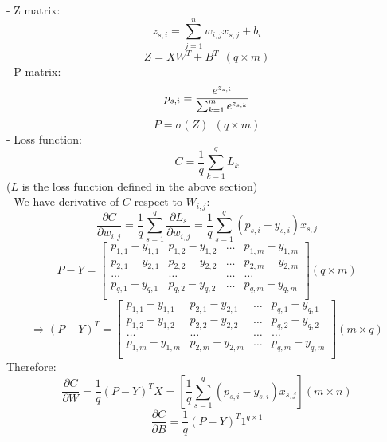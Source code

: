 \documentclass{article}
\begin{document}
    - Z matrix:
    \[
        z_{s, i} = \sum_{j = 1}^{n}w_{i, j}x_{s, j} + b_i
    \]
    \[
        Z = XW^T + B^T \ \ (q \times m)
    \]
    - P matrix:
    \[
        p_{s, i} = \frac{e^{z_{s, i}}}{\sum_{k = 1}^{m}e^{z_{s, k}}} \\  
    \]
    \[
        P = \sigma(Z) \ \ (q \times m)
    \]
    - Loss function:
    \[
        C = \frac{1}{q}\sum_{k = 1}^{q}L_k
    \]
    ($L$ is the loss function defined in the above section)\\
    - We have derivative of $C$ respect to $W_{i, j}$:
    \[
        \frac{\partial C}{\partial w_{i, j}} = 
        \frac{1}{q}\sum_{s = 1}^{q}\frac{\partial L_s}{\partial w_{i, j}} = 
        \frac{1}{q}\sum_{s = 1}^{q}(p_{s, i} - y_{s, i})x_{s, j}
    \] 
    \[
        P - Y = \begin{bmatrix}
            p_{1, 1} - y_{1, 1} & p_{1, 2} - y_{1, 2} & \hdots & p_{1, m} - y_{1, m} \\
            p_{2, 1} - y_{2, 1} & p_{2, 2} - y_{2, 2} & \hdots & p_{2, m} - y_{2, m} \\
            \hdots  & \hdots  & \hdots & \hdots  \\
            p_{q, 1} - y_{q, 1} & p_{q, 2} - y_{q, 2} & \hdots & p_{q, m} - y_{q, m} \\
        \end{bmatrix} (q \times m)
    \]
    \[
        \Rightarrow (P - Y)^T = \begin{bmatrix}
            p_{1, 1} - y_{1, 1} & p_{2, 1} - y_{2, 1} & \hdots & p_{q, 1} - y_{q, 1} \\
            p_{1, 2} - y_{1, 2} & p_{2, 2} - y_{2, 2} & \hdots & p_{q, 2} - y_{q, 2} \\
            \hdots  & \hdots  & \hdots & \hdots  \\
            p_{1, m} - y_{1, m} & p_{2, m} - y_{2, m} & \hdots & p_{q, m} - y_{q, m} \\
        \end{bmatrix} (m \times q)
    \]
    Therefore:
    \[
        \frac{\partial C}{\partial W} = \frac{1}{q}(P - Y)^TX = 
        \left[\frac{1}{q}\sum_{s = 1}^{q}(p_{s, i} - y_{s, i})x_{s, j}\right] (m \times n)
    \]
    \[
        \frac{\partial C}{\partial B} =  \frac{1}{q}(P - Y)^T1^{q \times 1}
    \]
\end{document}
